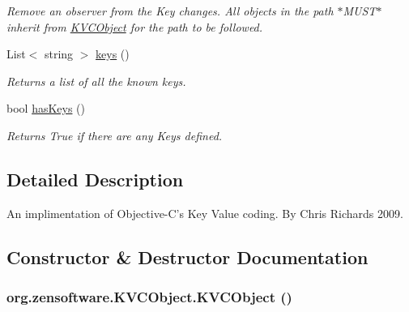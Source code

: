\begin{DoxyCompactItemize}
\begin{DoxyCompactList}\small\item\em Remove an observer from the Key changes. All objects in the path $\ast$MUST$\ast$ inherit from \hyperlink{classorg_1_1zensoftware_1_1_k_v_c_object}{KVCObject} for the path to be followed. \item\end{DoxyCompactList}\item 
List$<$ string $>$ \hyperlink{classorg_1_1zensoftware_1_1_k_v_c_object_ab9bf6eabd045ca108db9e7634c3208fc}{keys} ()
\begin{DoxyCompactList}\small\item\em Returns a list of all the known keys. \item\end{DoxyCompactList}\item 
bool \hyperlink{classorg_1_1zensoftware_1_1_k_v_c_object_a992d4fa105d7f90c3d0aba1e5a4680ad}{hasKeys} ()
\begin{DoxyCompactList}\small\item\em Returns True if there are any Keys defined. \item\end{DoxyCompactList}\end{DoxyCompactItemize}


\subsection{Detailed Description}
An implimentation of Objective-\/C's Key Value coding. By Chris Richards 2009. 

\subsection{Constructor \& Destructor Documentation}
\hypertarget{classorg_1_1zensoftware_1_1_k_v_c_object_afab44f2fd361e453ddafc043782af58a}{
\subsubsection[{KVCObject}]{\setlength{\rightskip}{0pt plus 5cm}org.zensoftware.KVCObject.KVCObject ()}}
\label{classorg_1_1zensoftware_1_1_k_v_c_object_afab44f2fd361e453ddafc043782af58a}


